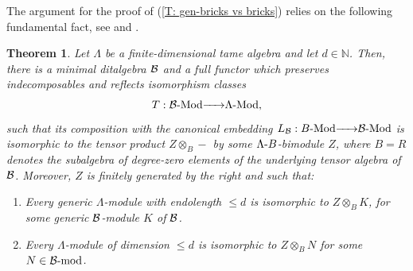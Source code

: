 \documentclass{article}
\newtheorem{theorem}{Theorem}[section]
\theoremstyle{definition}
\newcommand{\Mod}{{ \rm Mod }}
\newcommand{\g}{\hbox{-}}
\newcommand{\hueca}[1]{\mathbb{#1}}
\renewcommand{\mod}{{\rm mod }}
\newcommand{\rightmap}[1]{\smash{\mathop{\hbox to 
20pt{\rightarrowfill}}\limits^{#1}}}
\begin{document}
The argument for the proof of (\ref{T: gen-bricks vs bricks}) relies  on the following fundamental fact, 
see \cite{CB2} and \cite[(29.9)]{BSZ}. 

\begin{theorem}\label{T: gens for tame algs}
 Let $\Lambda$ be a finite-dimensional tame algebra  and let $d\in \hueca{N}$. Then, there is a minimal ditalgebra ${\cal B}$ and a full functor  which preserves indecomposables and reflects isomorphism classes 
 $$T:{\cal B}\g\Mod\rightmap{}\Lambda\g\Mod,$$ 
 such that its composition with the canonical embedding $L_{\cal B}:B\g\Mod\rightmap{}{\cal B}\g\Mod$ is isomorphic to the tensor product $Z\otimes_B-$ by some $\Lambda\g B$-bimodule $Z$, where $B=R$ denotes the subalgebra of degree-zero elements of the underlying tensor algebra of ${\cal B}$. Moreover, $Z$ is finitely generated by the right and such that:
\begin{enumerate}
\item Every generic $\Lambda$-module with endolength $\leq d$ is isomorphic to $Z\otimes_BK$, for some generic ${\cal B}$-module $K$ of ${\cal B}$.
\item  Every $\Lambda$-module of dimension $\leq d$ is isomorphic to $Z\otimes_BN$ for some $N\in {\cal B}\g\mod$.  
\end{enumerate}
\end{theorem}
\end{document}
